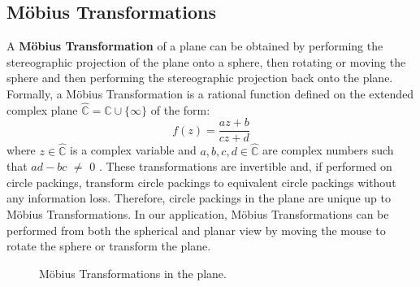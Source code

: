\documentclass[11pt]{article}
\newcommand{\C}{\mathbb{C}}
\newcommand{\CP}{\hat{\mathbb{C}}}
\begin{document}
\subsection{M\"{o}bius Transformations}
 A \textbf{M\"{o}bius Transformation} of a plane can be obtained by performing the stereographic projection of the plane onto a sphere, then rotating or moving the sphere and then performing the stereographic projection back onto the plane. 
  Formally, a M\"{o}bius Transformation is a rational function defined on the extended complex plane $\CP = \C\cup\{\infty\}$ of the form:
  \begin{equation} 
  	f(z) = \frac{az+b}{cz+d}
  \end{equation}
  where $z\in\CP$ is a complex variable and $a,b,c,d\in\CP$ are complex numbers such that $ad - bc$ $\neq$ $0$ \cite{stephenson05introduction}. These transformations are invertible and, if performed on circle packings, transform circle packings to equivalent circle packings without any information loss. Therefore, circle packings in the plane are unique up to M\"{o}bius Transformations. In our application, M\"{o}bius Transformations can be performed from both the spherical and planar view by moving the mouse to rotate the sphere or transform the plane.
    \begin{figure}[h]%
	\centering
	\qquad
	\caption{M\"{o}bius Transformations in the plane.}%
	\label{fig:mobiusplane}%
\end{figure}
\end{document}
